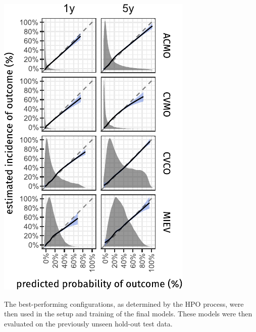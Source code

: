 \begin{marginfigure}
    \includegraphics{graphics/pmhnet-v2-visual-calibration.pdf}
    \caption[Calibration of  models at 1 and 5 years]{%
        Calibration plots comparing 
        the cause-specific \(t\)-year  model predictions 
        with the estimated incidences at a 1 and 5 year prediction horizon.
        The included  regression line is obtained by fitting a natural
        cubic spline (\(d.o.f. = 6\)) with pseudo-values obtained
        by jackknife resampling of the Kaplan-Meier 
        ()
        or the Aalen-Johansen 
        (, , and )
        estimates.
        The dashed 45-degree reference lines represent perfect calibration. 
        The density curve in the background of each panel shows the 
        distribution of the model estimates.
    }
\end{marginfigure}


The best-performing configurations, 
as determined by the \ac{HPO} process,
were then used in the setup and training of 
the final  models.
These models were then evaluated on 
the previously unseen hold-out test data.



